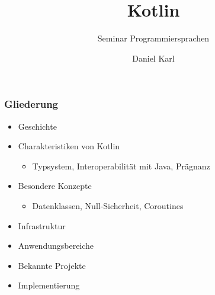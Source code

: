 \documentclass{beamer}
\title{Kotlin}
\subtitle{Seminar Programmiersprachen}
\author[D. Karl]
{Daniel Karl}
\begin{document}
\maketitle
\begin{frame}
\frametitle{Gliederung}

\begin{itemize}
\onehalfspacing
    \item Geschichte
    \item Charakteristiken von Kotlin
    \begin{itemize}
        \item Typsystem, Interoperabilität mit Java, Prägnanz
    \end{itemize}
    \item Besondere Konzepte
    \begin{itemize}
    \item Datenklassen, Null-Sicherheit, Coroutines
    \end{itemize}
    \item Infrastruktur
    \item Anwendungsbereiche
    \item Bekannte Projekte
    \item Implementierung
\end{itemize}
\end{frame}
\end{document}
